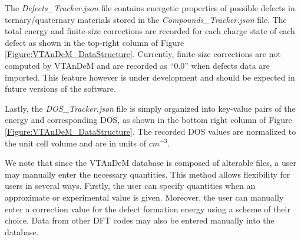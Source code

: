 \documentclass[%
 reprint,
 amsmath,amssymb,
 aps,
]{revtex4-1}
\begin{document}
The \textit{Defects\_Tracker.json} file contains energetic properties of possible defects in ternary/quaternary materials stored in the \textit{Compounds\_Tracker.json} file. The total energy and finite-size corrections are recorded for each charge state of each defect as shown in the top-right column of Figure \ref{Figure:VTAnDeM_DataStructure}. Currently, finite-size corrections are not computed by VTAnDeM and are recorded as ``0.0'' when defects data are imported. This feature however is under development and should be expected in future versions of the software.

Lastly, the \textit{DOS\_Tracker.json} file is simply organized into key-value pairs of the energy and corresponding DOS, as shown in the bottom right column of Figure \ref{Figure:VTAnDeM_DataStructure}. The recorded DOS values are normalized to the unit cell volume and are in units of $cm^{-3}$.

We note that since the VTAnDeM database is composed of alterable files, a user may manually enter the necessary quantities. This method allows flexibility for users in several ways. Firstly, the user can specify quantities when an approximate or experimental value is given. Moreover, the user can manually enter a correction value for the defect formation energy using a scheme of their choice. Data from other DFT codes may also be entered manually into the database.



\end{document}
